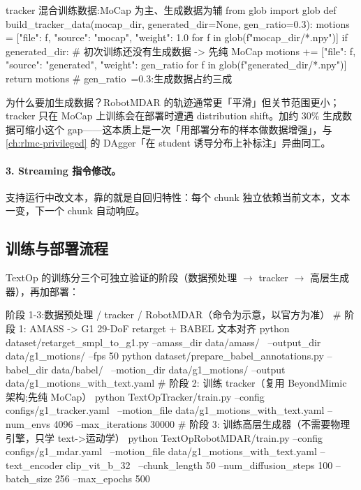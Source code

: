 \begin{codebox}[Python]{tracker 混合训练数据:MoCap 为主、生成数据为辅}
from glob import glob
def build_tracker_data(mocap_dir, generated_dir=None, gen_ratio=0.3):
    motions = [{"file": f, "source": "mocap", "weight": 1.0}
               for f in glob(f"{mocap_dir}/*.npy")]
    if generated_dir:                       # 初次训练还没有生成数据 -> 先纯 MoCap
        motions += [{"file": f, "source": "generated", "weight": gen_ratio}
                    for f in glob(f"{generated_dir}/*.npy")]
    return motions                          # gen_ratio~=0.3:生成数据占约三成
\end{codebox}

为什么要加生成数据？RobotMDAR 的轨迹通常更「平滑」但关节范围更小；tracker 只在 MoCap 上训练会在部署时遭遇 distribution shift。加约 30\% 生成数据可缩小这个 gap——这本质上是一次「用部署分布的样本做数据增强」，与 \cref{ch:rlmc-privileged} 的 DAgger「在 student 诱导分布上补标注」异曲同工。

\paragraph{3. Streaming 指令修改。}支持运行中改文本，靠的就是自回归特性：每个 chunk 独立依赖当前文本，文本一变，下一个 chunk 自动响应。

\subsection{训练与部署流程}
\label{sec:rlmc-mm-textop-flow}

TextOp 的训练分三个可独立验证的阶段（数据预处理 $\to$ tracker $\to$ 高层生成器），再加部署：

\begin{codebox}[bash]{阶段 1-3:数据预处理 / tracker / RobotMDAR（命令为示意，以官方为准）}
# 阶段 1: AMASS -> G1 29-DoF retarget + BABEL 文本对齐
python dataset/retarget_smpl_to_g1.py --amass_dir data/amass/ \
    --output_dir data/g1_motions/ --fps 50
python dataset/prepare_babel_annotations.py --babel_dir data/babel/ \
    --motion_dir data/g1_motions/ --output data/g1_motions_with_text.yaml
# 阶段 2: 训练 tracker（复用 BeyondMimic 架构;先纯 MoCap）
python TextOpTracker/train.py --config configs/g1_tracker.yaml \
    --motion_file data/g1_motions_with_text.yaml --num_envs 4096 --max_iterations 30000
# 阶段 3: 训练高层生成器（不需要物理引擎，只学 text->运动学）
python TextOpRobotMDAR/train.py --config configs/g1_mdar.yaml \
    --motion_file data/g1_motions_with_text.yaml --text_encoder clip_vit_b_32 \
    --chunk_length 50 --num_diffusion_steps 100 --batch_size 256 --max_epochs 500
\end{codebox}

